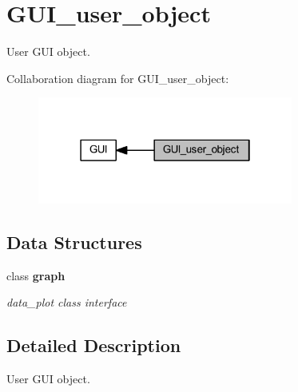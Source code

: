 \section{G\+U\+I\+\_\+user\+\_\+object}
\label{group___g_u_i__user__object}


User G\+UI object.  


Collaboration diagram for G\+U\+I\+\_\+user\+\_\+object\+:\nopagebreak
\begin{figure}[H]
\begin{center}
\leavevmode
\includegraphics[width=238pt]{group___g_u_i__user__object}
\end{center}
\end{figure}
\subsection*{Data Structures}
\begin{DoxyCompactItemize}
\item 
class \textbf{ graph}
\begin{DoxyCompactList}\small\item\em data\+\_\+plot class interface \end{DoxyCompactList}\end{DoxyCompactItemize}


\subsection{Detailed Description}
User G\+UI object. 

